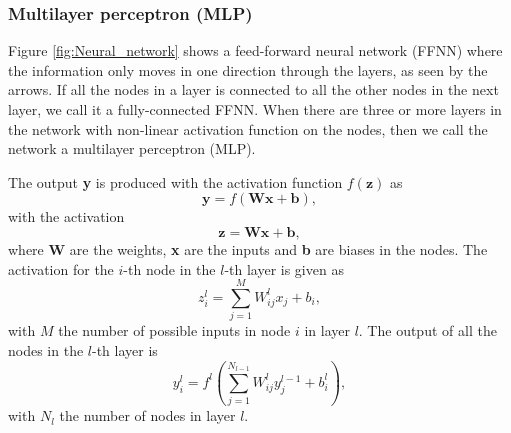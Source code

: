 \documentclass[12pt,a4paper,english]{article}
\begin{document}
\subsubsection{Multilayer perceptron (MLP)}
\label{subsect:MLP}
Figure \ref{fig:Neural_network} shows a feed-forward neural network (FFNN) where the information only moves in one direction through the layers, as seen by the arrows. If all the nodes in a layer is connected to all the other nodes in the next layer, we call it a fully-connected FFNN. When there are three or more layers in the network with non-linear activation function on the nodes, then we call the network a multilayer perceptron (MLP).

The output \textbf{y} is produced with the activation function $f(\textbf{z})$ as
\[\textbf{y}=f(\textbf{Wx}+\textbf{b}),\]
with the activation 
\[\textbf{z}=\textbf{Wx}+\textbf{b},\]
where \textbf{W} are the weights, \textbf{x} are the inputs and \textbf{b} are biases in the nodes. The activation for the $i$-th node in the $l$-th layer is given as
\[z_i^l=\sum_{j=1}^{M}W^l_{ij}x_j+b_i,\]
with $M$ the number of possible inputs in node $i$ in layer $l$. The output of all the nodes in the $l$-th layer is
\[y_i^l=f^l\left(\sum_{j=1}^{N_{l-1}}W_{ij}^ly_j^{l-1}+b_i^l\right),\]
with $N_l$ the number of nodes in layer $l$.
\end{document}
